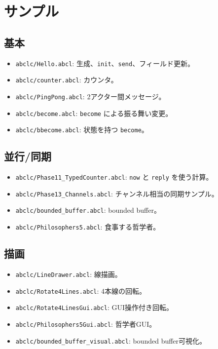 \documentclass[11pt,a4paper,uplatex,dvipdfmx]{jsarticle}
\begin{document}
\section{サンプル}

\subsection{基本}

\begin{itemize}
  \item \texttt{abclc/Hello.abcl}: 生成、\texttt{init}、\texttt{send}、フィールド更新。
  \item \texttt{abclc/counter.abcl}: カウンタ。
  \item \texttt{abclc/PingPong.abcl}: 2アクター間メッセージ。
  \item \texttt{abclc/become.abcl}: \texttt{become} による振る舞い変更。
  \item \texttt{abclc/bbecome.abcl}: 状態を持つ \texttt{become}。
\end{itemize}

\subsection{並行/同期}

\begin{itemize}
  \item \texttt{abclc/Phase11\_TypedCounter.abcl}: \texttt{now} と \texttt{reply} を使う計算。
  \item \texttt{abclc/Phase13\_Channels.abcl}: チャンネル相当の同期サンプル。
  \item \texttt{abclc/bounded\_buffer.abcl}: bounded buffer。
  \item \texttt{abclc/Philosophers5.abcl}: 食事する哲学者。
\end{itemize}

\subsection{描画}

\begin{itemize}
  \item \texttt{abclc/LineDrawer.abcl}: 線描画。
  \item \texttt{abclc/Rotate4Lines.abcl}: 4本線の回転。
  \item \texttt{abclc/Rotate4LinesGui.abcl}: GUI操作付き回転。
  \item \texttt{abclc/Philosophers5Gui.abcl}: 哲学者GUI。
  \item \texttt{abclc/bounded\_buffer\_visual.abcl}: bounded buffer可視化。
\end{itemize}
\end{document}
